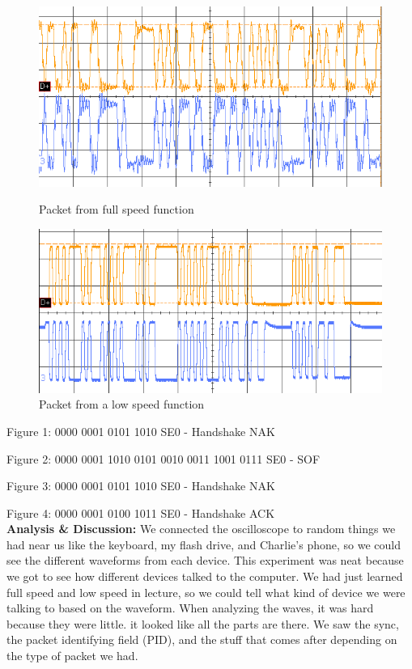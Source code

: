 \documentclass{article}
\newcommand{\sect}[1]{\noindent\textbf{#1}}
\begin{document}
\begin{figure}[H]
\centering
\begin{minipage}[t]{.5\textwidth}
	\centering
	\includegraphics[width=.94\linewidth]{5}
	\caption{Packet from full speed function}
\end{minipage}%
\begin{minipage}[t]{.5\textwidth}
	\centering
	\includegraphics[width=.94\linewidth]{4}
	\caption{Packet from a low speed function}
\end{minipage}
\end{figure}

Figure 1: 0000 0001 0101 1010 SE0 - Handshake NAK

Figure 2: 0000 0001 1010 0101 0010 0011 1001 0111 SE0 - SOF

Figure 3: 0000 0001 0101 1010 SE0 - Handshake NAK

Figure 4: 0000 0001 0100 1011 SE0 - Handshake ACK\\

\sect{Analysis \& Discussion:} We connected the oscilloscope to random things we had near us like the keyboard, my flash drive, and Charlie's phone, so we could see the different waveforms from each device. This experiment was neat because we got to see how different devices talked to the computer. We had just learned full speed and low speed in lecture, so we could tell what kind of device we were talking to based on the waveform. When analyzing the waves, it was hard because they were little. it looked like all the parts are there. We saw the sync, the packet identifying field (PID), and the stuff that comes after depending on the type of packet we had.\\
\end{document}

